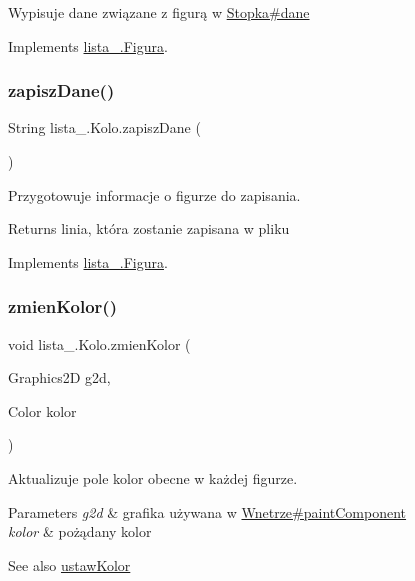 Wypisuje dane związane z figurą w \mbox{\hyperlink{classlista__5_1_1_stopka_a8e8ef21758defd5b137e609b00d2f59e}{Stopka\#dane}} 

Implements \mbox{\hyperlink{interfacelista__5_1_1_figura_aaddd90c61fd1632655cb031efafe1a7d}{lista\+\_.\+Figura}}.

\mbox{\label{classlista__5_1_1_kolo_ab812bc5ce875bf87c7c4268d4f1c8aa2}} 
\subsubsection{\texorpdfstring{zapisz\+Dane()}{zapiszDane()}}
{\footnotesize\ttfamily String lista\+\_.\+Kolo.\+zapisz\+Dane (\begin{DoxyParamCaption}{ }\end{DoxyParamCaption})}

Przygotowuje informacje o figurze do zapisania. \begin{DoxyReturn}{Returns}
linia, która zostanie zapisana w pliku
\end{DoxyReturn}
 

Implements \mbox{\hyperlink{interfacelista__5_1_1_figura_a9d60d64b495755a3e48a3eee549a728d}{lista\+\_.\+Figura}}.

\mbox{\label{classlista__5_1_1_kolo_af4a5e91767dcc103808fb63f39b7404a}} 
\subsubsection{\texorpdfstring{zmien\+Kolor()}{zmienKolor()}}
{\footnotesize\ttfamily void lista\+\_.\+Kolo.\+zmien\+Kolor (\begin{DoxyParamCaption}\item[{Graphics2D}]{g2d,  }\item[{Color}]{kolor }\end{DoxyParamCaption})}

Aktualizuje pole kolor obecne w każdej figurze. 
\begin{DoxyParams}{Parameters}
{\em g2d} & grafika używana w \mbox{\hyperlink{classlista__5_1_1_wnetrze_aa8676192e150a17230d72de122744a47}{Wnetrze\#paint\+Component}} \\
\hline
{\em kolor} & pożądany kolor \\
\hline
\end{DoxyParams}
\begin{DoxySeeAlso}{See also}
\mbox{\hyperlink{interfacelista__5_1_1_figura_a3cc13bf7229b288d743be7903b3b61a4}{ustaw\+Kolor}}
\end{DoxySeeAlso}
 

